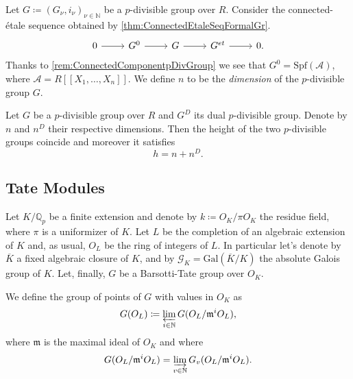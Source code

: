 \begin{defn}
	Let $G \coloneqq \left(G_{\nu}, i_\nu\right)_{\nu \in \mathbb{N}}$ be a $p$-divisible group
	over $R$.
	Consider the connected-étale sequence obtained by 
	\cref{thm:ConnectedEtaleSeqFormalGr}.
	\begin{equation*}
	\begin{tikzcd}
		0 \arrow[r, "", rightarrow] &
		G^0 \arrow[r, "", rightarrow] &
		G \arrow[r, "", rightarrow] &
		G^{et} \arrow[r, "", rightarrow] &
		0
	.\end{tikzcd}
	\end{equation*}
	Thanks to \cref{rem:ConnectedComponentpDivGroup} we see that
	$G^0 = \mathrm{Spf}(\mathscr{A})$, where
	$\mathscr{A} = R [\![ X_1, \ldots, X_{ n } ]\!]$.
	We define $n$ to be the {\em dimension} of the $p$-divisible group $G$.
\end{defn}


\begin{prop}
	Let $G$ be a $p$-divisible group over $R$
	and $G^D$ its dual $p$-divisible group.
	Denote by $n$ and $n^D$ their respective dimensions.
	Then the height of the two $p$-divisible groups
	coincide and moreover it satisfies
	\begin{equation*}
	h = n + n^D
	.\end{equation*}
\end{prop}



\subsection{Tate Modules}
Let $K/\mathbb{Q}_p$ be a finite extension and denote by $k \coloneqq O_K/\pi O_K$
the residue field, where $\pi$ is a uniformizer of $K$.
Let $L$ be the completion of an algebraic extension of $K$ and, as usual,
$O_L$ be the ring of integers of $L$.
In particular let's denote by $\overline{K}$ a fixed algebraic closure
of $K$, and by $\mathscr{G}_K = \mathrm{Gal}\left( \overline{K} / K \right)$
the absolute Galois group of $K$.
Let, finally, $G$ be a Barsotti-Tate group over $O_K$.


\begin{defn}[]\label{defn:valuationBTGroup}
	We define the group of points of $G$ with values in $O_K$ as
	\begin{equation*}
		G(O_L) \coloneqq \varprojlim_{i \in \mathbb{N}} G(O_L/\mathfrak{m}^iO_L)
	,\end{equation*}
	where $\mathfrak{m}$ is the maximal ideal of $O_K$ and where
	\begin{equation*}
		G(O_L/\mathfrak{m}^iO_L) = \varinjlim_{v \in \mathbb{N}} G_v(O_L/\mathfrak{m}^iO_L)
	.\end{equation*}
\end{defn}


